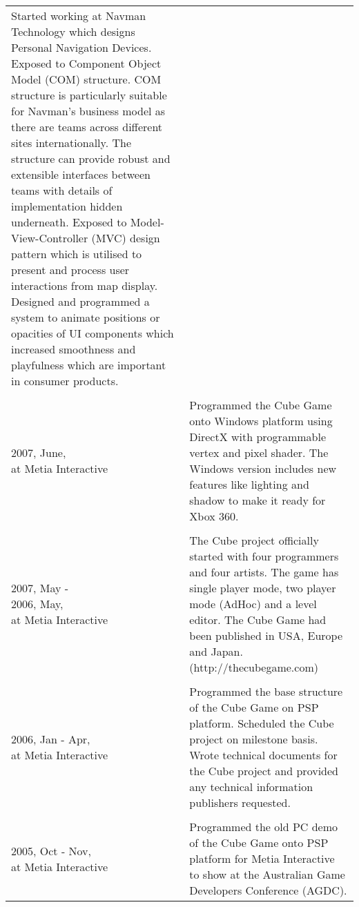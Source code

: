 \begin{resume}
\begin{tabular}{ll}
{Started working at Navman Technology which designs Personal Navigation Devices. Exposed to Component Object Model (COM) structure. COM structure is particularly suitable for Navman's business model as there are teams across different sites internationally. The structure can provide robust and extensible interfaces between teams with details of implementation hidden underneath. Exposed to Model-View-Controller (MVC) design pattern which is utilised to present and process user interactions from map display. Designed and programmed a system to animate positions or opacities of UI components which increased smoothness and playfulness which are important in consumer products.

}\\\\
\parbox[t]{35mm}{2007, June,\\at Metia Interactive} & \parbox[t]{111mm}{

Programmed the Cube Game onto Windows platform using DirectX with programmable vertex and pixel shader. The Windows version includes new features like lighting and shadow to make it ready for Xbox 360.

}\\\\
\parbox[t]{35mm}{2007, May - \\ 2006, May,\\at Metia Interactive} & \parbox[t]{111mm}{

The Cube project officially started with four programmers and four artists. The game has single player mode, two player mode (AdHoc) and a level editor. The Cube Game had been published in USA, Europe and Japan. (http://thecubegame.com)

}\\\\
\parbox[t]{35mm}{2006, Jan - Apr,\\at Metia Interactive} & \parbox[t]{111mm}{

Programmed the base structure of the Cube Game on PSP platform. Scheduled the Cube project on milestone basis. Wrote technical documents for the Cube project and provided any technical information publishers requested.

}\\\\
\parbox[t]{35mm}{2005, Oct  - Nov,\\at Metia Interactive} & \parbox[t]{111mm}{

Programmed the old PC demo of the Cube Game onto PSP platform for Metia Interactive to show at the Australian Game Developers Conference (AGDC).

}
\end{tabular}
\end{resume}
